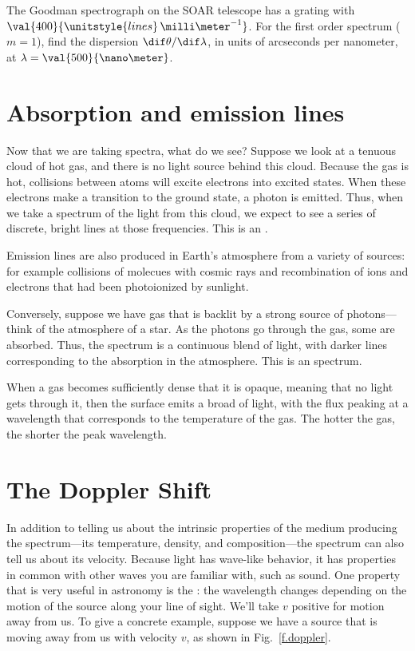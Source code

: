 \begin{exercisebox}
The Goodman spectrograph on the SOAR telescope has a grating with $\val{400}{\unitstyle{lines}\,\milli\meter^{-1}}$. For the first order spectrum ($m=1$), find the dispersion $\dif\theta/\dif\lambda$, in units of arcseconds per nanometer, at $\lambda = \val{500}{\nano\meter}$.
\end{exercisebox}

\section{Absorption and emission lines}
Now that we are taking spectra, what do we see?  Suppose we look at a tenuous cloud of hot gas, and there is no light source behind this cloud. Because the gas is hot, collisions between atoms will excite electrons into excited states. When these electrons make a transition to the ground state, a photon is emitted. Thus, when we take a spectrum of the light from this cloud, we expect to see a series of discrete, bright lines at those frequencies. This is an . 

Emission lines are also produced in Earth's atmosphere from a variety of sources: for example collisions of molecues with cosmic rays and recombination of ions and electrons that had been photoionized by sunlight.

Conversely, suppose we have gas that is backlit by a strong source of photons---think of the atmosphere of a star. As the photons go through the gas, some are absorbed. Thus, the spectrum is a continuous blend of light, with darker lines corresponding to the absorption in the atmosphere.  This is an  spectrum.

When a gas becomes sufficiently dense that it is opaque, meaning that no light gets through it, then the surface emits a broad  of light, with the flux peaking at a wavelength that corresponds to the temperature of the gas. The hotter the gas, the shorter the peak wavelength.


\section{The Doppler Shift}\label{s.doppler}

In addition to telling us about the intrinsic properties of the medium producing the spectrum---its temperature, density, and composition---the spectrum can also tell us about its velocity. Because light has wave-like behavior, it has properties in common with other waves you are familiar with, such as sound.  One property that is very useful in astronomy is the : the wavelength changes depending on the motion of the source along your line of sight. We'll take $v$ positive for motion away from us. To give a concrete example, suppose we have a source that is moving away from us with velocity $v$, as shown in Fig.~\ref{f.doppler}. 

